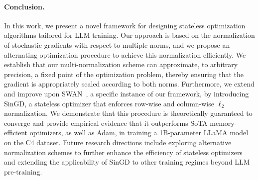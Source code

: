 \paragraph{Conclusion.}
In this work, we present a novel framework for designing stateless optimization algorithms tailored for LLM training. Our approach is based on the normalization of stochastic gradients with respect to multiple norms, and we propose an alternating optimization procedure to achieve this normalization efficiently. We establish that our multi-normalization scheme can approximate, to arbitrary precision, a fixed point of the optimization problem, thereby ensuring that the gradient is appropriately scaled according to both norms. Furthermore, we extend and improve upon SWAN~\cite{ma2024swansgdnormalizationwhitening}, a specific instance of our framework, by introducing SinGD, a stateless optimizer that enforces row-wise and column-wise $\ell_2$ normalization. We demonstrate that this procedure is theoretically guaranteed to converge and provide empirical evidence that it outperforms SoTA memory-efficient optimizers, as well as Adam, in training a 1B-parameter LLaMA model on the C4 dataset. Future research directions include exploring alternative normalization schemes to further enhance the efficiency of stateless optimizers and extending the applicability of SinGD to other training regimes beyond LLM pre-training.




